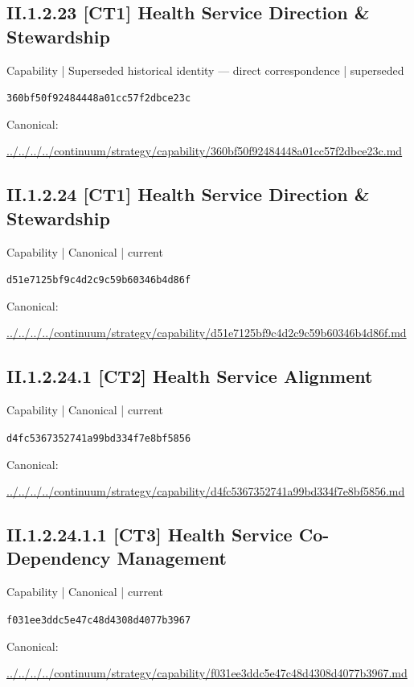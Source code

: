 \documentclass[10pt,a4paper]{article}
\begin{document}
\subsection*{II.1.2.23 [CT1] Health Service Direction \& Stewardship}
{\small Capability | Superseded historical identity — direct correspondence | superseded}\par
\texttt{360bf50f92484448a01cc57f2dbce23c}\par
Canonical: \par
{\footnotesize\url{../../../../continuum/strategy/capability/360bf50f92484448a01cc57f2dbce23c.md}}\par
\subsection*{II.1.2.24 [CT1] Health Service Direction \& Stewardship}
{\small Capability | Canonical | current}\par
\texttt{d51e7125bf9c4d2c9c59b60346b4d86f}\par
Canonical: \par
{\footnotesize\url{../../../../continuum/strategy/capability/d51e7125bf9c4d2c9c59b60346b4d86f.md}}\par
\subsection*{II.1.2.24.1 [CT2] Health Service Alignment}
{\small Capability | Canonical | current}\par
\texttt{d4fc5367352741a99bd334f7e8bf5856}\par
Canonical: \par
{\footnotesize\url{../../../../continuum/strategy/capability/d4fc5367352741a99bd334f7e8bf5856.md}}\par
\subsection*{II.1.2.24.1.1 [CT3] Health Service Co-Dependency Management}
{\small Capability | Canonical | current}\par
\texttt{f031ee3ddc5e47c48d4308d4077b3967}\par
Canonical: \par
{\footnotesize\url{../../../../continuum/strategy/capability/f031ee3ddc5e47c48d4308d4077b3967.md}}\par
\end{document}
